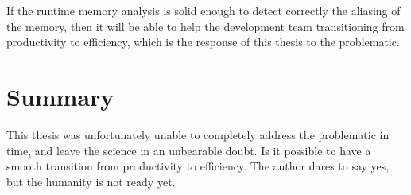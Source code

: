 If the runtime memory analysis is solid enough to detect correctly the aliasing of the memory, then it will be able to help the development team transitioning from productivity to efficiency, which is the response of this thesis to the problematic.


\section{Summary}

This thesis was unfortunately unable to completely address the problematic in time, and leave the science in an unbearable doubt.
Is it possible to have a smooth transition from productivity to efficiency.
The author dares to say yes, but the humanity is not ready yet.

